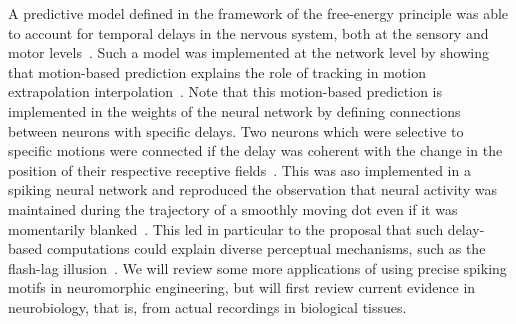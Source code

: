 \documentclass[brainsci, %
               review,submit,pdftex,moreauthors%
               ]{Definitions/mdpi}
\begin{document}
A predictive model defined in the framework of the free-energy principle was able to account for temporal delays in the nervous system, both at the sensory and motor levels~\citep{perrinet_active_2014}.  %
Such a model was implemented at the network level by showing that motion-based prediction explains the role of tracking in motion extrapolation interpolation~\citep{khoei_motion-based_2013}. Note that this motion-based prediction is implemented in the weights of the neural network by defining connections between neurons with specific delays.  Two neurons which were selective to specific motions were connected if the delay was coherent with the change in the position of their respective receptive fields~\citep{hogendoorn_predictive_2019}. This was aso implemented in a spiking neural network and reproduced the observation that neural activity was maintained during the trajectory of a smoothly moving dot even if it was momentarily blanked~\citep{kaplan_anisotropic_2013}. This led in particular to the proposal that such delay-based computations could explain diverse perceptual mechanisms, such as the flash-lag illusion~\citep{khoei_flash-lag_2017}. 
We will review some more applications of using precise spiking motifs in neuromorphic engineering, but will first review current evidence in neurobiology, that is, from actual recordings in biological tissues.
\end{document}
